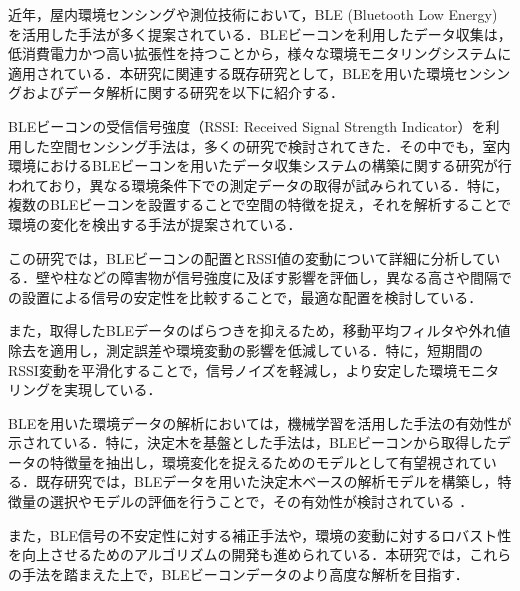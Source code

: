 近年，屋内環境センシングや測位技術において，BLE (Bluetooth Low Energy) を活用した手法が多く提案されている．BLEビーコンを利用したデータ収集は，低消費電力かつ高い拡張性を持つことから，様々な環境モニタリングシステムに適用されている．本研究に関連する既存研究として，BLEを用いた環境センシングおよびデータ解析に関する研究を以下に紹介する．

BLEビーコンの受信信号強度（RSSI: Received Signal Strength Indicator）を利用した空間センシング手法は，多くの研究で検討されてきた．その中でも，室内環境におけるBLEビーコンを用いたデータ収集システムの構築に関する研究が行われており，異なる環境条件下での測定データの取得が試みられている\cite{BLECE-Room_c_202205_yukimat_SeMI}．特に，複数のBLEビーコンを設置することで空間の特徴を捉え，それを解析することで環境の変化を検出する手法が提案されている．

この研究では，BLEビーコンの配置とRSSI値の変動について詳細に分析している．壁や柱などの障害物が信号強度に及ぼす影響を評価し，異なる高さや間隔での設置による信号の安定性を比較することで，最適な配置を検討している．

また，取得したBLEデータのばらつきを抑えるため，移動平均フィルタや外れ値除去を適用し，測定誤差や環境変動の影響を低減している．特に，短期間のRSSI変動を平滑化することで，信号ノイズを軽減し，より安定した環境モニタリングを実現している．


BLEを用いた環境データの解析においては，機械学習を活用した手法の有効性が示されている．特に，決定木を基盤とした手法は，BLEビーコンから取得したデータの特徴量を抽出し，環境変化を捉えるためのモデルとして有望視されている．既存研究では，BLEデータを用いた決定木ベースの解析モデルを構築し，特徴量の選択やモデルの評価を行うことで，その有効性が検討されている \cite{BLECE-Room_c_202205_yukimat_SeMI}．

また，BLE信号の不安定性に対する補正手法や，環境の変動に対するロバスト性を向上させるためのアルゴリズムの開発も進められている．本研究では，これらの手法を踏まえた上で，BLEビーコンデータのより高度な解析を目指す．
